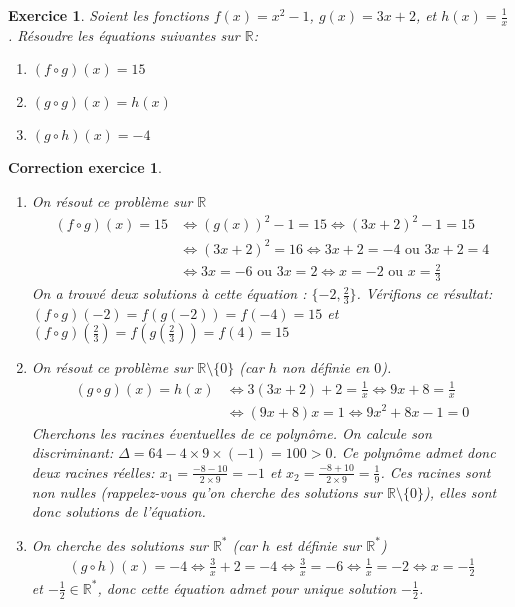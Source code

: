 \documentclass[12pt]{article}
\newtheorem{exercice}{\bf Exercice}
\newtheorem{correction}{\bf Correction exercice}
\newenvironment{exo}{
\begin{exercice}\smallskip\normalfont}{\end{exercice}
}
\newenvironment{cor}{
\begin{correction}\smallskip\normalfont}{\end{correction}
}
\newcommand*{\R}{\mathbb{R}}
\newif\ifcorrige\corrigetrue
\begin{document}


\begin{exo} Soient les fonctions $f(x) = x^2-1$, $g(x) = 3x+2$, et $h(x) = \frac1x$.
  R\'esoudre les \'equations suivantes sur $\R$:
\begin{multicols}{3}
\begin{enumerate}
\item $(f \circ g)(x) = 15$
\item $(g \circ g)(x) = h(x)$
\item $(g \circ h)(x) = -4$
\end{enumerate}
\end{multicols}
\end{exo}

\ifcorrige
\color{magenta}
\begin{cor}
  $\qquad$
\begin{enumerate}
\item On r\'esout ce probl\`eme sur $\R$
  \begin{align*}
    (f \circ g)(x) = 15
    &\iff
    (g(x))^2-1 = 15
    \iff
    (3x+2)^2-1 = 15
    \\
    &\iff
    (3x+2)^2 = 16
    \iff
    3x+2 = -4 \text{  ou  } 3x+2 = 4
    \\
    &\iff 3x = -6 \text{  ou  } 3x = 2
    \iff x = -2 \text{  ou  } x = \frac23
  \end{align*}
  On a trouv\'e deux solutions \`a cette \'equation : $\{-2,\frac23\}$.
  V\'erifions ce r\'esultat:
  $(f \circ g)(-2) = f(g(-2)) = f(-4) = 15$
  et $(f \circ g)(\frac23) = f(g(\frac23)) = f(4) = 15$
\item On r\'esout ce probl\`eme sur $\R \setminus \{ 0 \}$
  (car $h$ non d\'efinie en $0$).
  \begin{align*}
    (g \circ g)(x) = h(x)
    &\iff
    3(3x+2)+2 = \frac1x
    \iff
    9x+8 = \frac1x
    \\
    &\iff
    (9x+8)x = 1
    \iff
    9x^2+8x -1 = 0
  \end{align*}
  Cherchons les racines \'eventuelles de ce polyn\^ome.
  On calcule son discriminant:
  $\Delta = 64 - 4 \times 9 \times (-1) = 100 > 0$.
  Ce polyn\^ome admet donc deux racines r\'eelles:
  $x_1 = \frac{-8 -10}{2 \times 9} = -1$ et $x_2 = \frac{-8+10}{2 \times 9} = \frac19$.
  Ces racines sont non nulles (rappelez-vous qu'on cherche des solutions sur $\R \setminus \{ 0 \}$),
  elles sont donc solutions de l'\'equation.

\item On cherche des solutions sur $\R^*$ (car $h$ est d\'efinie sur $\R^*$)
  \begin{align*}
    (g \circ h)(x) = -4
    \iff
    \frac3x + 2 = -4
    \iff
    \frac3x = -6
    \iff
    \frac1x = -2
    \iff
    x = - \frac12
  \end{align*}
  et $- \frac12 \in \R^*$, donc cette \'equation admet pour unique solution $- \frac12$.
\end{enumerate}
\end{cor}
\color{black}
\fi
\end{document}
